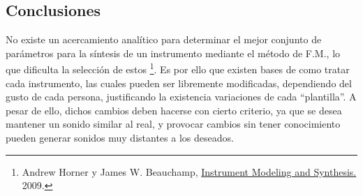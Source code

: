 \subsection{Conclusiones}
No existe un acercamiento analítico para determinar el mejor conjunto de parámetros para la síntesis de un instrumento mediante el método de F.M., lo que dificulta la selección de estos \footnote{Andrew Horner y James W. Beauchamp, \href{https://www.researchgate.net/publication/226790075_Instrument_Modeling_and_Synthesis}{Instrument Modeling and Synthesis.} 2009.}. Es por ello que existen bases de como tratar cada instrumento, las cuales pueden ser libremente modificadas, dependiendo del gusto de cada persona, justificando la existencia variaciones de cada ``plantilla''. A pesar de ello, dichos cambios deben hacerse con cierto criterio, ya que se desea mantener un sonido similar al real, y provocar cambios sin tener conocimiento pueden generar sonidos muy distantes a los deseados.